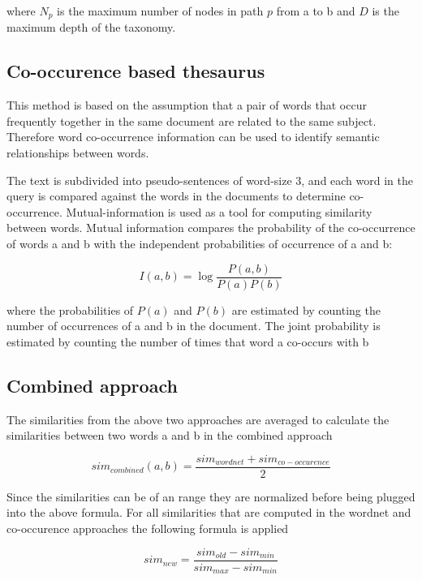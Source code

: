 \documentclass[a4paper, 12pt, notitlepage]{report}
\begin{document}
where $N_p$ is the maximum number of nodes in path $p$ from a to b and $D$ is the maximum depth of the taxonomy.

\subsection*{Co-occurence based thesaurus}
This method is based on the assumption that a pair of words that occur frequently together in the same document are related to the same subject. Therefore word co-occurrence information can be used to identify semantic relationships between words.\cite{paper}

The text is subdivided into pseudo-sentences of word-size 3, and each word in the query is compared against the words in the documents to determine co-occurrence. Mutual-information is used as a tool for computing similarity between words. Mutual information compares the probability of the co-occurrence of words a and b with the independent probabilities of occurrence of a and b:

\begin{equation*}
I(a,b) = \log\frac{P(a,b)}{P(a)P(b)}
\end{equation*}

where the probabilities of $P(a)$ and $P(b)$ are estimated by counting the number of occurrences of a and b in the document. The joint probability is estimated by counting the number of times that word a co-occurs with b

\subsection*{Combined approach}
The similarities from the above two approaches are averaged to calculate the similarities between two words a and b in the combined approach

\begin{equation*}
sim_{combined} (a,b) = \frac{sim_{wordnet} + sim_{co-occurence}}{2}
\end{equation*}

Since the similarities can be of an range they are normalized before being plugged into the above formula. For all similarities that are computed in the wordnet and co-occurence approaches the following formula is applied

\begin{equation*}
sim_{new} = \frac{sim_{old} - sim_{min}}{sim_{max} - sim_{min}}
\end{equation*}
\end{document}
